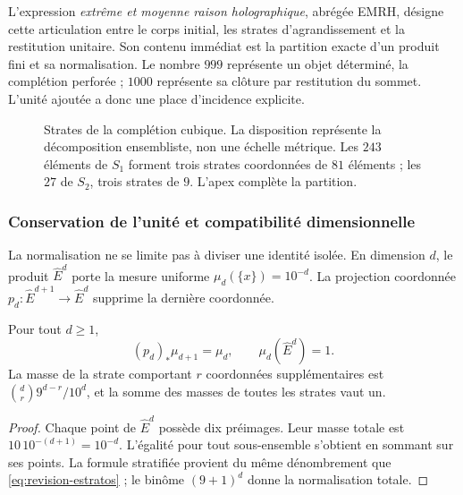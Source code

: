 L’expression \emph{extrême et moyenne raison holographique}, abrégée EMRH,
désigne cette articulation entre le corps initial, les
strates d’agrandissement et la restitution unitaire. Son contenu immédiat
est la partition exacte d’un produit fini et sa normalisation. Le nombre
\(999\) représente un objet déterminé, la complétion perforée ;
\(1000\) représente sa clôture par restitution du sommet. L’unité
ajoutée a donc une place d’incidence explicite.

\begin{figure}[htbp]
\centering
{}
\caption{Strates de la complétion cubique. La disposition représente
la décomposition ensembliste, non une échelle métrique. Les \(243\) éléments
de \(S_1\) forment trois strates coordonnées de \(81\) éléments ; les \(27\)
de \(S_2\), trois strates de \(9\). L'apex complète la partition.}
\label{fig:revision-emrh}
\end{figure}



\subsubsection{Conservation de l'unité et compatibilité dimensionnelle}

La normalisation ne se limite pas à diviser une identité isolée. En dimension
\(d\), le produit \(\widehat E^d\) porte la mesure uniforme
\(\mu_d(\{x\})=10^{-d}\). La projection coordonnée
\(p_d:\widehat E^{d+1}\to\widehat E^d\) supprime la dernière coordonnée.

\begin{proposition}
Pour tout \(d\geq1\),
\[
 (p_d)_*\mu_{d+1}=\mu_d,
 \qquad \mu_d(\widehat E^d)=1.
\]
La masse de la strate comportant \(r\) coordonnées supplémentaires est
\(\binom dr9^{d-r}/10^d\), et la somme des masses de toutes les strates
vaut un.
\end{proposition}
\begin{proof}
Chaque point de \(\widehat E^d\) possède dix préimages. Leur masse totale est
\(10\,10^{-(d+1)}=10^{-d}\). L'égalité pour tout sous-ensemble
s'obtient en sommant sur ses points. La formule stratifiée provient
du même dénombrement que \eqref{eq:revision-estratos} ; le binôme
\((9+1)^d\) donne la normalisation totale.
\end{proof}

